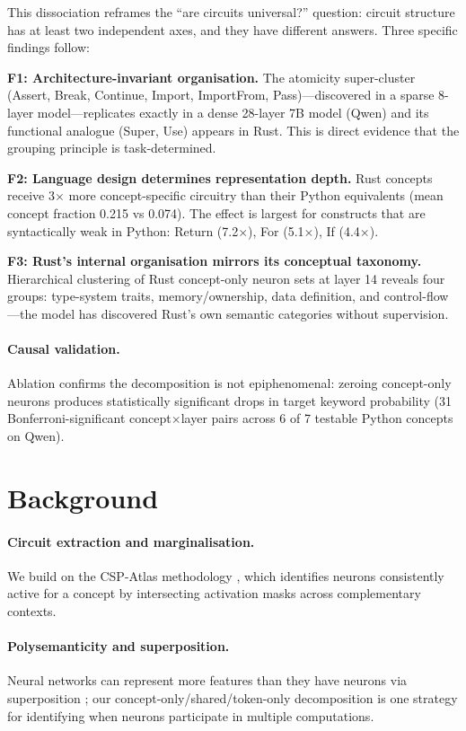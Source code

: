 \documentclass[11pt]{article}
\begin{document}
This dissociation reframes the ``are circuits universal?'' question: circuit structure has at least two independent axes, and they have different answers. Three specific findings follow:

\textbf{F1: Architecture-invariant organisation.} The atomicity super-cluster (Assert, Break, Continue, Import, ImportFrom, Pass)---discovered in a sparse 8-layer model---replicates exactly in a dense 28-layer 7B model (Qwen) and its functional analogue (Super, Use) appears in Rust. This is direct evidence that the grouping principle is task-determined.

\textbf{F2: Language design determines representation depth.} Rust concepts receive 3$\times$ more concept-specific circuitry than their Python equivalents (mean concept fraction 0.215 vs 0.074). The effect is largest for constructs that are syntactically weak in Python: Return (7.2$\times$), For (5.1$\times$), If (4.4$\times$).

\textbf{F3: Rust's internal organisation mirrors its conceptual taxonomy.} Hierarchical clustering of Rust concept-only neuron sets at layer 14 reveals four groups: type-system traits, memory/ownership, data definition, and control-flow---the model has discovered Rust's own semantic categories without supervision.

\paragraph{Causal validation.} Ablation confirms the decomposition is not epiphenomenal: zeroing concept-only neurons produces statistically significant drops in target keyword probability (31 Bonferroni-significant concept$\times$layer pairs across 6 of 7 testable Python concepts on Qwen).

\section{Background}

\paragraph{Circuit extraction and marginalisation.} We build on the CSP-Atlas methodology \citep{csp2025}, which identifies neurons consistently active for a concept by intersecting activation masks across complementary contexts.

\paragraph{Polysemanticity and superposition.} Neural networks can represent more features than they have neurons via superposition \citep{elhage2022}; our concept-only/shared/token-only decomposition is one strategy for identifying when neurons participate in multiple computations.
\end{document}
